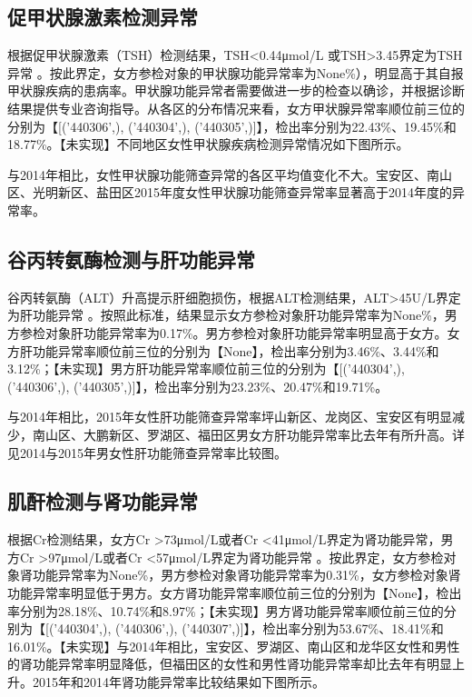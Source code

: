  

\subsection{促甲状腺激素检测异常}

根据促甲状腺激素（TSH）检测结果，TSH<0.44μmol/L 或TSH>3.45界定为TSH异常 。按此界定，女方参检对象的甲状腺功能异常率为None\%），明显高于其自报甲状腺疾病的患病率。甲状腺功能异常者需要做进一步的检查以确诊，并根据诊断结果提供专业咨询指导。从各区的分布情况来看，女方甲状腺异常率顺位前三位的分别为【[('440306',), ('440304',), ('440305',)]】，检出率分别为22.43\%、19.45\%和18.77\%。【未实现】不同地区女性甲状腺疾病检测异常情况如下图所示。

 

与2014年相比，女性甲状腺功能筛查异常的各区平均值变化不大。宝安区、南山区、光明新区、盐田区2015年度女性甲状腺功能筛查异常率显著高于2014年度的异常率。

 

\subsection{谷丙转氨酶检测与肝功能异常}

谷丙转氨酶（ALT）升高提示肝细胞损伤，根据ALT检测结果，ALT>45U/L界定为肝功能异常 。按照此标准，结果显示女方参检对象肝功能异常率为None\%，男方参检对象肝功能异常率为0.17\%。男方参检对象肝功能异常率明显高于女方。女方肝功能异常率顺位前三位的分别为【None】，检出率分别为3.46\%、3.44\%和3.12\%；【未实现】男方肝功能异常率顺位前三位的分别为【[('440304',), ('440306',), ('440305',)]】，检出率分别为23.23\%、20.47\%和19.71\%。

 

与2014年相比，2015年女性肝功能筛查异常率坪山新区、龙岗区、宝安区有明显减少，南山区、大鹏新区、罗湖区、福田区男女方肝功能异常率比去年有所升高。详见2014与2015年男女性肝功能筛查异常率比较图。

 

\subsection{肌酐检测与肾功能异常}

根据Cr检测结果，女方Cr >73μmol/L或者Cr <41μmol/L界定为肾功能异常，男方Cr >97μmol/L或者Cr <57μmol/L界定为肾功能异常 。按此界定，女方参检对象肾功能异常率为None\%，男方参检对象肾功能异常率为0.31\%，女方参检对象肾功能异常率明显低于男方。女方肾功能异常率顺位前三位的分别为【None】，检出率分别为28.18\%、10.74\%和8.97\%；【未实现】男方肾功能异常率顺位前三位的分别为【[('440304',), ('440306',), ('440307',)]】，检出率分别为53.67\%、18.41\%和16.01\%。【未实现】与2014年相比，宝安区、罗湖区、南山区和龙华区女性和男性的肾功能异常率明显降低，但福田区的女性和男性肾功能异常率却比去年有明显上升。2015年和2014年肾功能异常率比较结果如下图所示。

